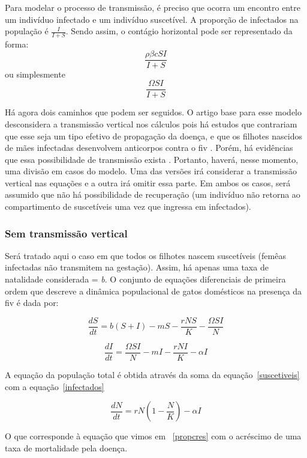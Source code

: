 \documentclass{article}
\begin{document}
\noindent Para modelar o processo de transmissão, é preciso que ocorra um encontro entre um indivíduo infectado e um indivíduo suscetível. A proporção de infectados na população é $\frac{I}{I+S}$. Sendo assim, o contágio horizontal pode ser representado da forma:
$$\frac{\rho \beta cSI}{I+S}$$
ou simplesmente 
$$\frac{\Omega SI}{I+S}$$

\noindent Há agora dois caminhos que podem ser seguidos. O artigo base para esse modelo desconsidera a transmissão vertical nos cálculos pois há estudos que contrariam que esse seja um tipo efetivo de propagação da doença, e que os filhotes nascidos de mães infectadas desenvolvem anticorpos contra o \gls{fiv} \cite{vertical}. Porém, há evidências que essa possibilidade de transmissão exista \cite{vertical2}. Portanto, haverá, nesse momento, uma divisão em casos do modelo. Uma das versões irá considerar a transmissão vertical nas equações e a outra irá omitir essa parte. Em ambos os casos, será assumido que não há possibilidade de recuperação (um indivíduo não retorna ao compartimento de suscetíveis uma vez que ingressa em infectados).

\subsubsection{Sem transmissão vertical}
Será tratado aqui o caso em que todos os filhotes nascem suscetíveis (femêas infectadas não transmitem na gestação). Assim, há apenas uma taxa de natalidade considerada = {\it b}. O conjunto de equações diferenciais de primeira ordem
que descreve a dinâmica populacional de gatos domésticos na presença da \gls{fiv} é dada por:

\begin{equation} \label{suscetiveis}
 \frac{dS}{dt}=b(S + I) - mS - \frac{rNS}{K} - \frac{\Omega SI}{N}
\end{equation}

\begin{equation} \label{infectados}
 \frac{dI}{dt}=  \frac{\Omega SI}{N} - mI - \frac{rNI}{K} - \alpha I
\end{equation}

A equação da população total é obtida através da soma da equação~\ref{suscetiveis} com a equação~\ref{infectados}

\begin{equation} \label{poptotal}
\frac{dN}{dt} = rN\left( 1-\frac{N}{K} \right) - \alpha I
\end{equation}

O que corresponde à equação que vimos em ~\ref{propcres} com o acréscimo de uma taxa de mortalidade pela doença.
\end{document}
